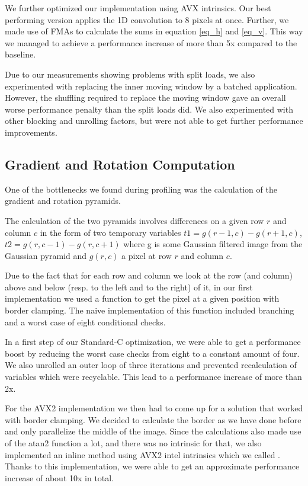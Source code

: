 \documentclass[letterpaper]{article}
\begin{document}
We further optimized our implementation using AVX intrinsics. Our best performing version applies the 1D convolution to 8 pixels at once. Further, we made use of FMAs to calculate the sums in equation \ref{eq_h} and \ref{eq_v}. This way we managed to achieve a performance increase of more than 5x compared to the baseline.

Due to our measurements showing problems with split loads, we also experimented with replacing the inner moving window by a batched application. However, the shuffling required to replace the moving window gave an overall worse performance penalty than the split loads did. We also experimented with other blocking and unrolling factors, but were not able to get further performance improvements.

\subsection*{Gradient and Rotation Computation}
One of the bottlenecks we found during profiling was the calculation of the gradient and rotation pyramids.

The calculation of the two pyramids involves differences on a given row $r$ and column $c$ in the form of two temporary variables $t1 = g(r-1,c) - g(r+1, c)$, $t2 = g(r,c-1) - g(r, c+1)$ where g is some Gaussian filtered image from the Gaussian pyramid and $g(r,c)$ a pixel at row $r$ and column $c$.

Due to the fact that for each row and column we look at the row (and column) above and below (resp. to the left and to the right) of it, in our first implementation we used a function to get the pixel at a given position with border clamping. The naive implementation of this function included branching and a worst case of eight conditional checks.

In a first step of our Standard-C optimization, we were able to get a performance boost by reducing the worst case checks from eight to a constant amount of four. We also unrolled an outer loop of three iterations and prevented recalculation of variables which were recyclable. This lead to a performance increase of more than 2x.

For the AVX2 implementation we then had to come up for a solution that worked with border clamping. We decided to calculate the border as we have done before and only parallelize the middle of the image. Since the calculations also made use of the atan2 function a lot, and there was no intrinsic for that, we also implemented an inline method using AVX2 intel intrinsics which we called . Thanks to this implementation, we were able to get an approximate performance increase of about 10x in total.
\end{document}

